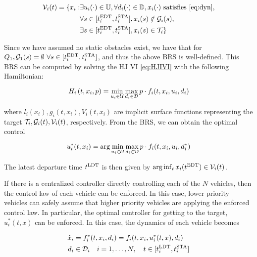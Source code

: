 \begin{equation}
\label{eq:BRS}
\begin{aligned}
\mathcal{V}_i(t) = \{x_i: &\exists u_i(\cdot) \in \mathbb{U}, \forall d_i(\cdot) \in \mathbb{D}, x_i(\cdot) \text{ satisfies \eqref{eq:dyn}}, \\
&\forall s \in [t^\text{EDT}_i, t^\text{STA}_i], x_i(s) \notin \mathcal{G}_i(s), \\
&\exists s \in [t^\text{EDT}_i, t^\text{STA}_i], x_i(s) \in \mathcal{T}_i\}
\end{aligned}
\end{equation}

Since we have assumed no static obstacles exist, we have that for $Q_1, \mathcal{G}_1(s)=\emptyset ~ \forall s \in [t^\text{EDT}_i, t^\text{STA}_i]$, and thus the above BRS is well-defined. This BRS can be computed by solving the HJ VI \eqref{eq:HJIVI} with the following Hamiltonian:

\begin{equation}
H_i\left(t, x_i, p\right) = \min_{u_i \in \mathcal{U}} \max_{d_i \in \mathcal{D}} p \cdot f_i(t, x_i, u_i, d_i)
\end{equation}

\noindent where $l_i(x_i), g_i(t,x_i),V_i(t,x_i)$ are implicit surface functions representing the target $\mathcal{T}_i, \mathcal{G}_i(t), \mathcal{V}_i(t)$, respectively. From the BRS, we can obtain the optimal control

\begin{equation}
\label{eq:opt_ctrl_i}
u_i^*(t,x_i) =  \arg \min_{u_i \in \mathcal{U}} \max_{d_i \in \mathcal{D}} p \cdot f_i(t, x_i, u_i, d^*_i)
\end{equation}

The latest departure time $t^\text{LDT}$ is then given by $\arg \inf_t x_i(t^\text{EDT}) \in \mathcal{V}_i(t)$.

If there is a centralized controller directly controlling each of the $N$ vehicles, then the control law of each vehicle can be enforced. In this case, lower priority vehicles can safely assume that higher priority vehicles are applying the enforced control law. In particular, the optimal controller for getting to the target, $u^*_i(t, x)$ can be enforced. In this case, the dynamics of each vehicle becomes 

\begin{equation}
\label{eq:dyn_cc}
\begin{aligned}
\dot x_i &= f^*_i (t, x_i, d_i) = f_i(t, x_i, u^*_i(t,x), d_i) \\
d_i &\in \mathcal{D}_i \quad i = 1,\ldots, N, \quad t \in [t^\text{LDT}_i, t^\text{STA}_i]
\end{aligned}
\end{equation}

